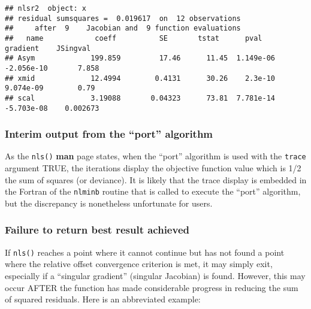 \documentclass[
]{article}
\newenvironment{Shaded}{\begin{snugshade}}{\end{snugshade}}
\newcommand{\CommentTok}[1]{\textcolor[rgb]{0.56,0.35,0.01}{\textit{#1}}}
\begin{document}
\begin{verbatim}
## nlsr2  object: x 
## residual sumsquares =  0.019617  on  12 observations
##     after  9    Jacobian and  9 function evaluations
##   name            coeff          SE       tstat      pval      gradient    JSingval   
## Asym             199.859         17.46      11.45  1.149e-06  -2.056e-10       7.858  
## xmid             12.4994        0.4131      30.26    2.3e-10   9.074e-09        0.79  
## scal             3.19088       0.04323      73.81  7.781e-14  -5.703e-08    0.002673
\end{verbatim}

\begin{Shaded}
\end{Shaded}

\hypertarget{interim-output-from-the-port-algorithm}{%
\subsubsection{Interim output from the ``port''
algorithm}\label{interim-output-from-the-port-algorithm}}

As the \texttt{nls()} \textbf{man} page states, when the ``port''
algorithm is used with the \texttt{trace} argument TRUE, the iterations
display the objective function value which is 1/2 the sum of squares (or
deviance). It is likely that the trace display is embedded in the
Fortran of the \texttt{nlminb} routine that is called to execute the
``port'' algorithm, but the discrepancy is nonetheless unfortunate for
users.

\hypertarget{failure-to-return-best-result-achieved}{%
\subsubsection{Failure to return best result
achieved}\label{failure-to-return-best-result-achieved}}

If \texttt{nls()} reaches a point where it cannot continue but has not
found a point where the relative offset convergence criterion is met, it
may simply exit, especially if a ``singular gradient'' (singular
Jacobian) is found. However, this may occur AFTER the function has made
considerable progress in reducing the sum of squared residuals. Here is
an abbreviated example:
\end{document}
